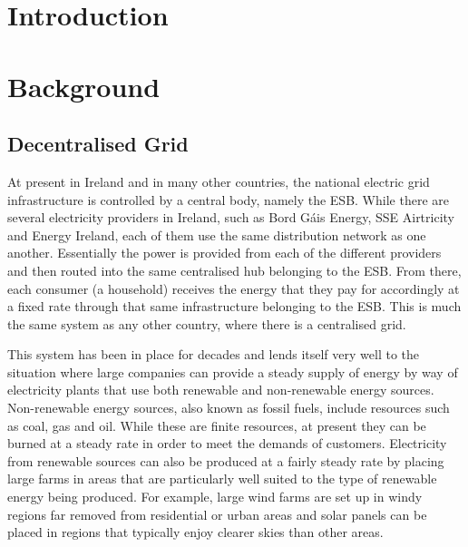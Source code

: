 \documentclass[a4paper, notitlepage]{report}
\author{Brian McNestry}
\date{\today}
\title{}
\begin{document}
\inserttitlepage


\declaration

\permissiontolend

\insertabstract

\acknowledgements

\tableofcontents

\newpage


\part{Introduction}
\label{sec:org77cc9a1}
\part{Background}
\label{sec:orgb37a954}
\chapter{Decentralised Grid}
\label{sec:orged129c3}
At present in Ireland and in many other countries, the national electric grid
infrastructure is controlled by a central body, namely the ESB. While there are
several electricity providers in Ireland, such as Bord Gáis Energy, SSE
Airtricity and Energy Ireland, each of them use the same distribution network as
one another. Essentially the power is provided from each of the different
providers and then routed into the same centralised hub belonging to the ESB.
From there, each consumer (a household) receives the energy that they pay for
accordingly at a fixed rate through that same infrastructure belonging to the
ESB. This is much the same system as any other country, where there is a
centralised grid. 

This system has been in place for decades and lends itself very well to the
situation where large companies can provide a steady supply of energy by way of
electricity plants that use both renewable and non-renewable energy sources.
Non-renewable energy sources, also known as fossil fuels, include resources such
as coal, gas and oil. While these are finite resources, at present they can be
burned at a steady rate in order to meet the demands of customers. Electricity
from renewable sources can also be produced at a fairly steady rate by placing
large farms in areas that are particularly well suited to the type of renewable
energy being produced. For example, large wind farms are set up in windy
regions far removed from residential or urban areas and solar panels can be
placed in regions that typically enjoy clearer skies than other areas.
\end{document}
